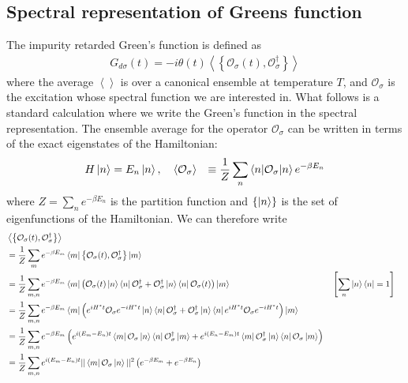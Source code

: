 \documentclass[reprint,hidelinks,onecolumn]{revtex4-2}
\begin{document}
\subsection{Spectral representation of Greens function}
The impurity retarded Green's function is defined as
\begin{equation}\begin{aligned}
	G_{d\sigma}(t) = -i\theta(t) \left<\left\{ \mathcal{O}_{\sigma}(t),\mathcal{O}^\dagger_{\sigma} \right\}  \right>
\end{aligned}\end{equation}
where the average \(\left< \right>\) is over a canonical ensemble at temperature \(T\), and \(\mathcal{O}_\sigma\) is the excitation whose spectral function we are interested in. What follows is a standard calculation where we write the Green's function in the spectral representation. The ensemble average for the operator \(\mathcal{O}_\sigma\) can be written in terms of the exact eigenstates of the Hamiltonian:
\begin{equation}\begin{aligned}
	H \ket{n} &= E_n \ket{n}, \quad\left<\mathcal{O}_\sigma\right> &\equiv \frac{1}{Z}\sum_n \braket{n | \mathcal{O}_\sigma | n} e^{-\beta E_n}
\end{aligned}\end{equation}
where \(Z = \sum_n e^{-\beta E_n}\) is the partition function and \(\left\{ \ket{n} \right\} \) is the set of eigenfunctions of the Hamiltonian. We can therefore write
\begin{equation}\begin{aligned}
	&\left<\left\{ \mathcal{O}_{\sigma}(t),\mathcal{O}^\dagger_{\sigma} \right\}  \right> \\
	&= \frac{1}{Z}\sum_{m}e^{-\beta E_m}\bra{m}\left\{ \mathcal{O}_{\sigma}(t),\mathcal{O}^\dagger_{\sigma} \right\} \ket{m}\\
	&= \frac{1}{Z}\sum_{m,n}e^{-\beta E_m}\bra{m}\left( \mathcal{O}_{\sigma}(t)\ket{n}\bra{n}\mathcal{O}^\dagger_{\sigma} + \mathcal{O}^\dagger_{\sigma}\ket{n}\bra{n}\mathcal{O}_{\sigma}(t)\right) \ket{m} && \left[\sum_n \ket{n}\bra{n} = 1\right]  \\
	&= \frac{1}{Z}\sum_{m,n}e^{-\beta E_m}\bra{m}\left( e^{iH^* t}\mathcal{O}_{\sigma}e^{-iH^* t}\ket{n}\bra{n}\mathcal{O}^\dagger_{\sigma} + \mathcal{O}^\dagger_{\sigma}\ket{n}\bra{n}e^{iH^* t}\mathcal{O}_{\sigma}e^{-iH^* t}\right) \ket{m}\\
	&= \frac{1}{Z}\sum_{m,n}e^{-\beta E_m}\left( e^{i\left( E_m - E_n \right)  t}\bra{m}\mathcal{O}_{\sigma}\ket{n}\bra{n}\mathcal{O}^\dagger_{\sigma} \ket{m} + e^{i\left( E_n - E_m \right)  t}\bra{m}\mathcal{O}^\dagger_{\sigma}\ket{n}\bra{n}\mathcal{O}_{\sigma} \ket{m}\right)\\
	&= \frac{1}{Z}\sum_{m,n}e^{i\left( E_m - E_n \right)  t}||\bra{m}\mathcal{O}_{\sigma}\ket{n}||^2\left( e^{-\beta E_m} + e^{-\beta E_n}\right)\\
\end{aligned}\end{equation}
\end{document}
